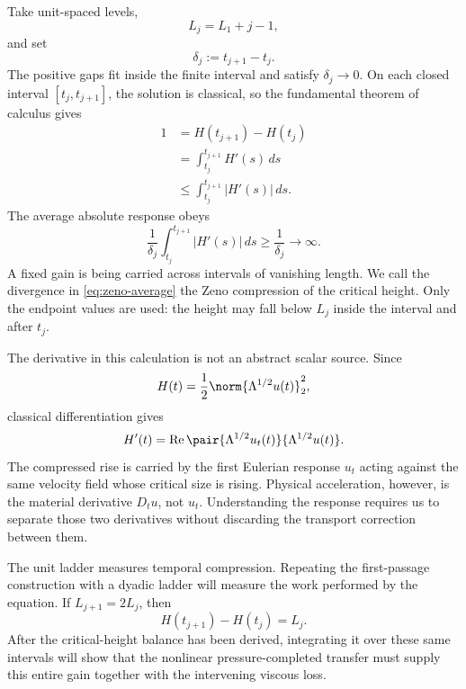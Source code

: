 Take unit-spaced levels,
\begin{equation*}
 L_j=L_1+j-1,
\end{equation*}
and set
\begin{equation*}
 \delta_j:=t_{j+1}-t_j.
\end{equation*}
The positive gaps fit inside the finite interval and satisfy
\(\delta_j\to0\).  On each closed interval
\([t_j,t_{j+1}]\), the solution is classical, so the fundamental theorem of
calculus gives
\begin{align*}
 1
 &=H(t_{j+1})-H(t_j)
 \\
 &=\int_{t_j}^{t_{j+1}}H'(s)\,ds
 \\
 &\le\int_{t_j}^{t_{j+1}}|H'(s)|\,ds.
\end{align*}
The average absolute response obeys
\begin{equation}
 \frac1{\delta_j}
 \int_{t_j}^{t_{j+1}}|H'(s)|\,ds
 \ge\frac1{\delta_j}
 \longrightarrow\infty.
 \label{eq:zeno-average}
\end{equation}
A fixed gain is being carried across intervals of vanishing length.  We call
the divergence in \eqref{eq:zeno-average} the Zeno
compression of the critical height.  Only the endpoint values are used: the
height may fall below \(L_j\) inside the interval and after \(t_j\).

The derivative in this calculation is not an abstract scalar source.  Since
\[
 H(t)=\frac12\norm{\Lambda^{1/2}u(t)}_2^2,
\]
classical differentiation gives
\begin{equation*}
 H'(t)=\operatorname{Re}
 \pair{\Lambda^{1/2}u_t(t)}{\Lambda^{1/2}u(t)}.
\end{equation*}
The compressed rise is carried by the first Eulerian response \(u_t\) acting
against the same velocity field whose critical size is rising.  Physical
acceleration, however, is the material derivative \(D_tu\), not \(u_t\).
Understanding the response requires us to separate those two derivatives
without discarding the transport correction between them.

The unit ladder measures temporal compression.  Repeating the first-passage
construction with a dyadic ladder will measure the work performed by the
equation.  If
\(L_{j+1}=2L_j\), then
\begin{equation*}
 H(t_{j+1})-H(t_j)=L_j.
\end{equation*}
After the critical-height balance has been derived, integrating it over these
same intervals will show that the nonlinear pressure-completed transfer must
supply this entire gain together with the intervening viscous loss.

